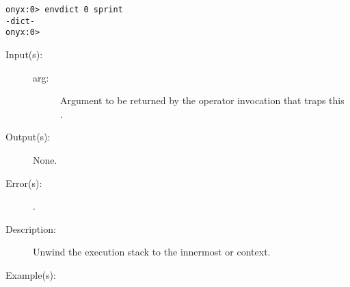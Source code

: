 \begin{description}
\begin{description}
\begin{verbatim}
onyx:0> envdict 0 sprint
-dict-
onyx:0>
		\end{verbatim}
	\end{description}
\label{systemdict:escape}
\item[{\onyxop{arg}{escape}{--}}: ]
	\begin{description}\item[]
	\item[Input(s): ]
		\begin{description}\item[]
		\item[arg: ]
			Argument to be returned by the
			operator invocation that traps this .
		\end{description}
	\item[Output(s): ] None.
	\item[Error(s): ]
		\begin{description}\item[]
		\item[.]
		\end{description}
	\item[Description: ]
		Unwind the execution stack to the innermost
		 or
		 context.
	\item[Example(s): ]\begin{verbatim}


\end{verbatim}
\end{description}
\end{description}
